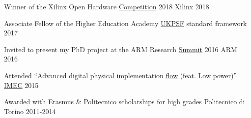 \vspace{-0.3mm}
\begin{cvhonors}

\cvhonor
{Winner of the Xilinx Open Hardware
{\color{myblue}\href{http://www.openhw.eu/2018-finalists.html}{Competition}}
2018}
{Xilinx}
{}
{2018}

\cvhonor
{Associate Fellow of the Higher Education Academy} %
{{\color{myblue}\href{https://www.heacademy.ac.uk/ukpsf}{UKPSF}} standard 
framework} %
{} %
{2017} %

\cvhonor
{Invited to present my PhD project at the ARM Research
{\color{myblue}\href{https://developer.arm.com/research/summit/previous-summits/2016/speakers}{Summit}}
 2016}
{ARM}
{}
{2016}

\cvhonor
{Attended ``Advanced digital physical implementation
{\color{myblue}\href{http://www.europractice.stfc.ac.uk/training/training_flyers/adpi20171024.pdf}{flow}}
 (feat. Low power)''}
{\color{myblue}\href{https://www.imec-int.com/en/about-us}{IMEC}}
{}
{2015}

\cvhonor
{Awarded with Erasmus \& Politecnico scholarships for high grades}
{Politecnico di Torino}
{}
{2011-2014}


\end{cvhonors}